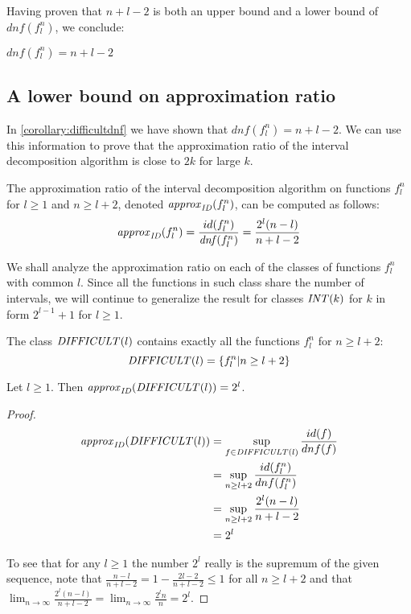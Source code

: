 Having proven that $n+l-2$ is both an upper bound
and a lower bound of $dnf(f_l^n)$,
we conclude:
\begin{corollary}
\label{corollary:difficultdnf}
$dnf(f_l^n) = n+l-2$
\end{corollary}

\subsection{A lower bound on approximation ratio}

In \cref{corollary:difficultdnf}
we have shown that $dnf(f_l^n) = n+l-2$.
We can use this information to prove
that the approximation ratio
of the interval decomposition algorithm is close to $2k$
for large $k$.

The approximation ratio
of the interval decomposition algorithm
on functions $f_l^n$
for $l \geq 1$ and $n \geq l+2$,
denoted $\mathit{approx}_{\mathit{ID}} (f_l^n)$,
can be computed as follows:
$$
\mathit{approx}_{\mathit{ID}} (f_l^n)
= \frac{id(f_l^n)}{\mathit{dnf}(f_l^n)}
= \frac{2^l(n-l)}{n+l-2}
$$

\newcommand{\difficultl}[1]{\apply{\mathit{DIFFICULT}}{#1}}

We shall analyze the approximation ratio
on each of the classes of functions $f_l^n$
with common $l$.
Since all the functions in such class
share the number of intervals,
we will continue to generalize the result
for classes $\mathit{INT} (k)$
for $k$ in form $2^{l-1} + 1$ for $l \geq 1$.

\begin{definition}
The class $\difficultl{l}$ contains exactly
all the functions $f_l^n$ for $n \geq l+2$:
$$
\difficultl{l}
= \curly{f_l^n | n \geq l + 2}
$$
\end{definition}

\begin{observation}
\label{observation:difficultapproxidl}
Let $l \geq 1$.
Then $\approxid{\difficultl{l}} = 2^l$.
\end{observation}

\begin{proof}
\begin{align*}
\approxid{\difficultl{l}}
&= \sup_{f \in \difficultl{l}}{\frac{id(f)}{dnf(f)}} \\
&= \sup_{n \geq l+2}{\frac{id(f_l^n)}{dnf(f_l^n)}} \\
&= \sup_{n \geq l+2}{\frac{2^l(n-l)}{n+l-2}} \\
&= 2^l
\end{align*}

To see that for any $l \geq 1$
the number $2^l$ really is the supremum of the given sequence,
note that $\frac{n-l}{n+l-2}
= 1 - \frac{2l-2}{n+l-2} \leq 1$
for all $n \geq l+2$
and that
$\lim_{n \rightarrow \infty}{\frac{2^l(n-l)}{n+l-2}}
= \lim_{n \rightarrow \infty}{\frac{2^l n}{n}}
= 2^l$.
\end{proof}

